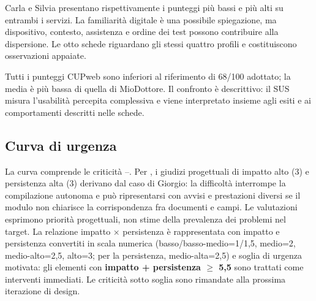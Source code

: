 \noindent Carla e Silvia presentano rispettivamente i punteggi più bassi
e più alti su entrambi i servizi. La familiarità digitale è una possibile
spiegazione, ma dispositivo, contesto, assistenza e ordine dei test possono
contribuire alla dispersione. Le otto schede riguardano gli stessi quattro
profili e costituiscono osservazioni appaiate.

Tutti i punteggi CUPweb sono inferiori al riferimento di 68/100 adottato;
la media è più bassa di quella di MioDottore. Il confronto è descrittivo:
il SUS misura l'usabilità percepita complessiva e viene interpretato
insieme agli esiti e ai comportamenti descritti nelle schede.

\subsection{Curva di urgenza}

La curva comprende le criticità --. Per
, i giudizi progettuali di impatto alto (3) e persistenza
alta (3) derivano dal caso di Giorgio: la difficoltà interrompe la
compilazione autonoma e può ripresentarsi con avvisi e prestazioni diversi
se il modulo non chiarisce la corrispondenza fra documenti e campi.
Le valutazioni esprimono priorità progettuali, non stime della prevalenza
dei problemi nel target.
La relazione impatto × persistenza è rappresentata con impatto e
persistenza convertiti in scala numerica (basso/basso-medio=1/1,5,
medio=2, medio-alto=2,5, alto=3; per la persistenza,
medio-alta=2,5) e soglia di urgenza motivata: gli
elementi con \textbf{impatto + persistenza $\geq$ 5,5} sono trattati
come interventi immediati. Le criticità sotto soglia sono rimandate
alla prossima iterazione di design.

